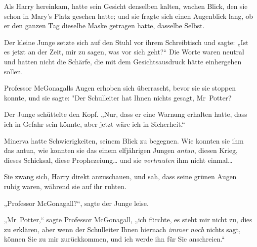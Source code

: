 Als Harry hereinkam, hatte sein Gesicht denselben kalten, wachen Blick, den sie schon in Mary's Platz gesehen hatte; und sie fragte sich einen Augenblick lang, ob er den ganzen Tag dieselbe Maske getragen hatte, dasselbe Selbst.

Der kleine Junge setzte sich auf den Stuhl vor ihrem Schreibtisch und sagte: „Ist es jetzt an der Zeit, mir zu sagen, was vor sich geht?“ Die Worte waren neutral und hatten nicht die Schärfe, die mit dem Gesichtsausdruck hätte einhergehen sollen.

Professor McGonagalls Augen erhoben sich überrascht, bevor sie sie stoppen konnte, und sie sagte: "Der Schulleiter hat Ihnen nichts gesagt, Mr~Potter?

Der Junge schüttelte den Kopf. „Nur, dass er eine Warnung erhalten hatte, dass ich in Gefahr sein könnte, aber jetzt wäre ich in Sicherheit.“

Minerva hatte Schwierigkeiten, seinem Blick zu begegnen. Wie konnten sie ihm das antun, wie konnten sie das einem elfjährigen Jungen \emph{antun}, diesen Krieg, dieses Schicksal, diese Prophezeiung… und sie \emph{vertrauten} ihm nicht einmal…

Sie zwang sich, Harry direkt anzuschauen, und sah, dass seine grünen Augen ruhig waren, während sie auf ihr ruhten.

„Professor McGonagall?“, sagte der Junge leise.

„Mr~Potter,“ sagte Professor McGonagall, „ich fürchte, es steht mir nicht zu, dies zu erklären, aber wenn der Schulleiter Ihnen hiernach \emph{immer} \emph{noch} nichts sagt, können Sie zu mir zurückkommen, und ich werde ihn für Sie anschreien.“

